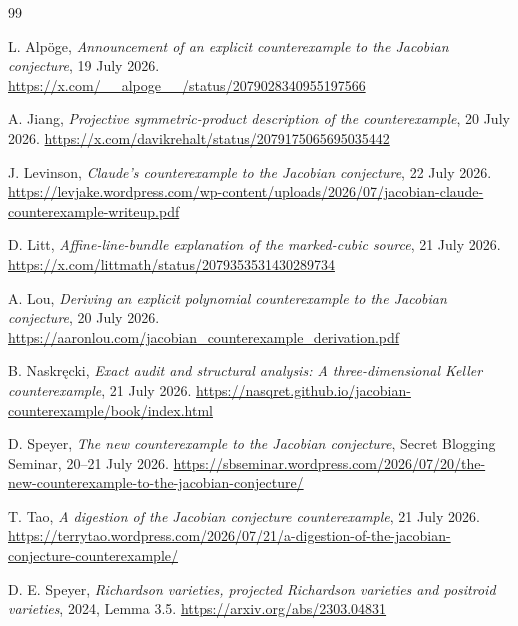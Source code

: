 \documentclass[11pt]{article}
\theoremstyle{remark}
\begin{document}
\begin{thebibliography}{99}

L. Alp\"oge,
\emph{Announcement of an explicit counterexample to the Jacobian conjecture},
19 July 2026.
\url{https://x.com/__alpoge__/status/2079028340955197566}

A. Jiang,
\emph{Projective symmetric-product description of the counterexample},
20 July 2026.
\url{https://x.com/davikrehalt/status/2079175065695035442}

J. Levinson,
\emph{Claude's counterexample to the Jacobian conjecture}, 22 July 2026.
\url{https://levjake.wordpress.com/wp-content/uploads/2026/07/jacobian-claude-counterexample-writeup.pdf}

D. Litt,
\emph{Affine-line-bundle explanation of the marked-cubic source},
21 July 2026.
\url{https://x.com/littmath/status/2079353531430289734}

A. Lou,
\emph{Deriving an explicit polynomial counterexample to the Jacobian conjecture},
20 July 2026.
\url{https://aaronlou.com/jacobian_counterexample_derivation.pdf}

B. Naskr\k{e}cki,
\emph{Exact audit and structural analysis: A three-dimensional Keller counterexample},
21 July 2026.
\url{https://nasqret.github.io/jacobian-counterexample/book/index.html}

D. Speyer,
\emph{The new counterexample to the Jacobian conjecture},
Secret Blogging Seminar, 20--21 July 2026.
\url{https://sbseminar.wordpress.com/2026/07/20/the-new-counterexample-to-the-jacobian-conjecture/}

T. Tao,
\emph{A digestion of the Jacobian conjecture counterexample},
21 July 2026.
\url{https://terrytao.wordpress.com/2026/07/21/a-digestion-of-the-jacobian-conjecture-counterexample/}

D. E. Speyer,
\emph{Richardson varieties, projected Richardson varieties and positroid varieties},
2024, Lemma 3.5.
\url{https://arxiv.org/abs/2303.04831}

\end{thebibliography}
\end{document}
